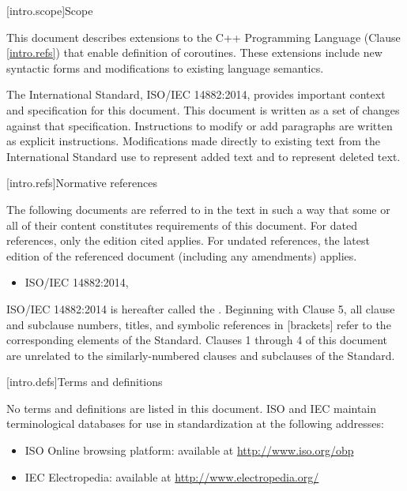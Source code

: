 
[intro.scope]{Scope}

\pnum
This document describes extensions to the C++ 
Programming Language (Clause \ref{intro.refs}) that
enable definition of coroutines. These extensions include 
new syntactic forms and modifications to existing language semantics.

\pnum
The International Standard, ISO/IEC 14882:2014, provides important context
and specification for this document. This document is 
written as a set of changes against that specification. Instructions
to modify or add paragraphs are written as explicit instructions. 
Modifications made directly to existing text from the International
Standard use  to represent added text and
 to represent deleted text. 

\begingroup
\renewcommand{\cleardoublepage}{}
\renewcommand{\clearpage}{}
[intro.refs]{Normative references}
\endgroup

\pnum
The following documents are referred to in the text in such a way that some or all of their content constitutes requirements of this document. For dated references, only the edition cited applies. For undated references, the latest edition of the referenced document (including any amendments) applies.

\begin{itemize}
	\item ISO/IEC 14882:2014, 
\end{itemize}

ISO/IEC 14882:2014 is hereafter called the .
%
Beginning with Clause 5, all clause and subclause numbers, titles,
and symbolic references in [brackets] refer to the corresponding elements of the \Cpp Standard. Clauses 1 through 4 of this document
are unrelated to the similarly-numbered clauses and subclauses of the \Cpp Standard.


\begingroup
\renewcommand{\cleardoublepage}{}
\renewcommand{\clearpage}{}
[intro.defs]{Terms and definitions}
\endgroup

No terms and definitions are listed in this document.
ISO and IEC maintain terminological databases for use in standardization at the following addresses:

\begin{itemize}
	\item ISO Online browsing platform: available at \url{http://www.iso.org/obp}
	\item IEC Electropedia: available at \url{http://www.electropedia.org/}
\end{itemize}

